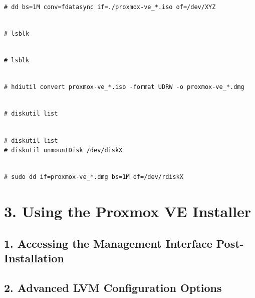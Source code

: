 \begin{lstlisting}

# dd bs=1M conv=fdatasync if=./proxmox-ve_*.iso of=/dev/XYZ

\end{lstlisting}

\begin{lstlisting}

# lsblk

\end{lstlisting}

\begin{lstlisting}

# lsblk

\end{lstlisting}

\begin{lstlisting}

# hdiutil convert proxmox-ve_*.iso -format UDRW -o proxmox-ve_*.dmg

\end{lstlisting}

\begin{lstlisting}

# diskutil list

\end{lstlisting}

\begin{lstlisting}

# diskutil list
# diskutil unmountDisk /dev/diskX

\end{lstlisting}

\begin{lstlisting}

# sudo dd if=proxmox-ve_*.dmg bs=1M of=/dev/rdiskX

\end{lstlisting}


\section{3. Using the Proxmox VE Installer}

\subsection{1. Accessing the Management Interface Post-Installation}

\subsection{2. Advanced LVM Configuration Options}

